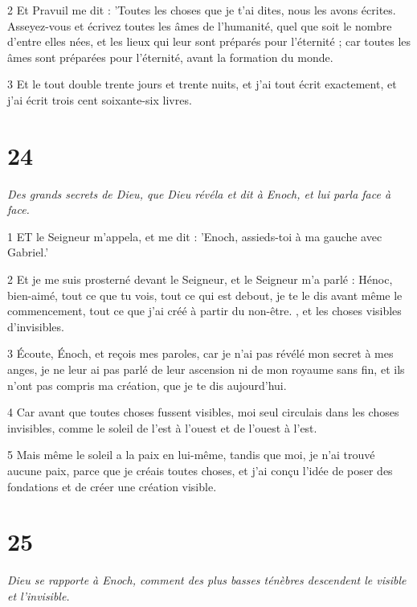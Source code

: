 \par 2 Et Pravuil me dit : 'Toutes les choses que je t'ai dites, nous les avons écrites. Asseyez-vous et écrivez toutes les âmes de l’humanité, quel que soit le nombre d’entre elles nées, et les lieux qui leur sont préparés pour l’éternité ; car toutes les âmes sont préparées pour l'éternité, avant la formation du monde.

\par 3 Et le tout double trente jours et trente nuits, et j'ai tout écrit exactement, et j'ai écrit trois cent soixante-six livres.

\chapter{24}

\par \textit{Des grands secrets de Dieu, que Dieu révéla et dit à Enoch, et lui parla face à face.}

\par 1 ET le Seigneur m'appela, et me dit : 'Enoch, assieds-toi à ma gauche avec Gabriel.'

\par 2 Et je me suis prosterné devant le Seigneur, et le Seigneur m'a parlé : Hénoc, bien-aimé, tout ce que tu vois, tout ce qui est debout, je te le dis avant même le commencement, tout ce que j'ai créé à partir du non-être. , et les choses visibles d'invisibles.

\par 3 Écoute, Énoch, et reçois mes paroles, car je n'ai pas révélé mon secret à mes anges, je ne leur ai pas parlé de leur ascension ni de mon royaume sans fin, et ils n'ont pas compris ma création, que je te dis aujourd'hui.

\par 4 Car avant que toutes choses fussent visibles, moi seul circulais dans les choses invisibles, comme le soleil de l'est à l'ouest et de l'ouest à l'est.

\par 5 Mais même le soleil a la paix en lui-même, tandis que moi, je n'ai trouvé aucune paix, parce que je créais toutes choses, et j'ai conçu l'idée de poser des fondations et de créer une création visible.

\chapter{25}

\par \textit{Dieu se rapporte à Enoch, comment des plus basses ténèbres descendent le visible et l'invisible.}

